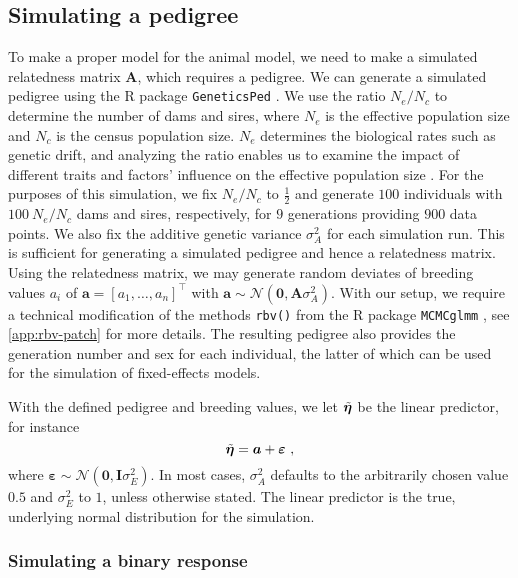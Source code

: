 \subsection{Simulating a pedigree}
To make a proper model for the animal model, we need to make a simulated relatedness matrix $\bm A$, which requires a pedigree. We can generate a simulated pedigree using the R package \texttt{GeneticsPed} \autocite{geneticsPed}.
We use the ratio $N_e/N_c$ to determine the number of dams and sires, where $N_e$ is the effective population size and $N_c$ is the census population size. $N_e$ determines the biological rates such as genetic drift, and analyzing the ratio enables us to examine the impact of different traits and factors' influence on the effective population size \autocite{NeNc2002}. For the purposes of this simulation, we fix $N_e/N_c$ to $\frac12$ and generate $100$ individuals with $100\ N_e/N_c$ dams and sires, respectively, for $9$ generations providing $900$ data points. We also fix the additive genetic variance $\sigma_A^2$ for each simulation run. This is sufficient for generating a simulated pedigree and hence a relatedness matrix. Using the relatedness matrix, we may generate random deviates of breeding values $a_i$ of $\bm a=[a_1, \dots, a_n]^\top$ with $\bm a \sim \mathcal N(\bm 0, \bm A \sigma^2_A)$. With our setup, we require a technical modification of the methods \texttt{rbv()} from the R package \texttt{MCMCglmm} \autocite{mcmcglmm}, see \autoref{app:rbv-patch} for more details. The resulting pedigree also provides the generation number and sex for each individual, the latter of which can be used for the simulation of fixed-effects models.

With the defined pedigree and breeding values, we let $\Tilde{\bm \eta}$ be the linear predictor, for instance
\begin{equation}
    \Tilde{\bm\eta} = \bm a + \bm\varepsilon \ ,
    \label{eq:simulation linear predictor}
\end{equation}
where $\bm\varepsilon \sim \mathcal N(\bm 0,\bm I \sigma^2_E)$. In most cases, $\sigma^2_A$ defaults to the arbitrarily chosen value $0.5$ and $\sigma^2_E$ to $1$, unless otherwise stated. The linear predictor is the true, underlying normal distribution for the simulation.

\subsubsection{Simulating a binary response}

